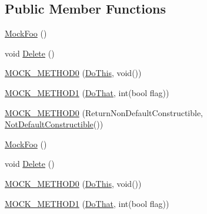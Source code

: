 \subsection*{Public Member Functions}
\begin{DoxyCompactItemize}
\item 
\mbox{\hyperlink{classtesting_1_1gmock__nice__strict__test_1_1_mock_foo_a43a103497aa475d4b1700f5116b35ef3}{Mock\+Foo}} ()
\item 
void \mbox{\hyperlink{classtesting_1_1gmock__nice__strict__test_1_1_mock_foo_a7bdec6a6353e4396d551dbf8f2beac54}{Delete}} ()
\item 
\mbox{\hyperlink{classtesting_1_1gmock__nice__strict__test_1_1_mock_foo_a14ee661ebc461096824e876a9308840e}{M\+O\+C\+K\+\_\+\+M\+E\+T\+H\+O\+D0}} (\mbox{\hyperlink{classtesting_1_1gmock__nice__strict__test_1_1_foo_a79a3cdbd8d9d9f6bc87580563b0d7cec}{Do\+This}}, void())
\item 
\mbox{\hyperlink{classtesting_1_1gmock__nice__strict__test_1_1_mock_foo_a3a7bfcf303a2c8578db900c9525b02a1}{M\+O\+C\+K\+\_\+\+M\+E\+T\+H\+O\+D1}} (\mbox{\hyperlink{classtesting_1_1gmock__nice__strict__test_1_1_foo_a8527a459b03f333a809a3376311a9f8b}{Do\+That}}, int(bool flag))
\item 
\mbox{\hyperlink{classtesting_1_1gmock__nice__strict__test_1_1_mock_foo_a2d69a27a8789f04938cb1eb0047bb677}{M\+O\+C\+K\+\_\+\+M\+E\+T\+H\+O\+D0}} (Return\+Non\+Default\+Constructible, \mbox{\hyperlink{classtesting_1_1gmock__nice__strict__test_1_1_not_default_constructible}{Not\+Default\+Constructible}}())
\item 
\mbox{\hyperlink{classtesting_1_1gmock__nice__strict__test_1_1_mock_foo_a43a103497aa475d4b1700f5116b35ef3}{Mock\+Foo}} ()
\item 
void \mbox{\hyperlink{classtesting_1_1gmock__nice__strict__test_1_1_mock_foo_a7bdec6a6353e4396d551dbf8f2beac54}{Delete}} ()
\item 
\mbox{\hyperlink{classtesting_1_1gmock__nice__strict__test_1_1_mock_foo_a14ee661ebc461096824e876a9308840e}{M\+O\+C\+K\+\_\+\+M\+E\+T\+H\+O\+D0}} (\mbox{\hyperlink{classtesting_1_1gmock__nice__strict__test_1_1_foo_a79a3cdbd8d9d9f6bc87580563b0d7cec}{Do\+This}}, void())
\item 
\mbox{\hyperlink{classtesting_1_1gmock__nice__strict__test_1_1_mock_foo_a3a7bfcf303a2c8578db900c9525b02a1}{M\+O\+C\+K\+\_\+\+M\+E\+T\+H\+O\+D1}} (\mbox{\hyperlink{classtesting_1_1gmock__nice__strict__test_1_1_foo_a8527a459b03f333a809a3376311a9f8b}{Do\+That}}, int(bool flag))
\item 

\end{DoxyCompactItemize}
